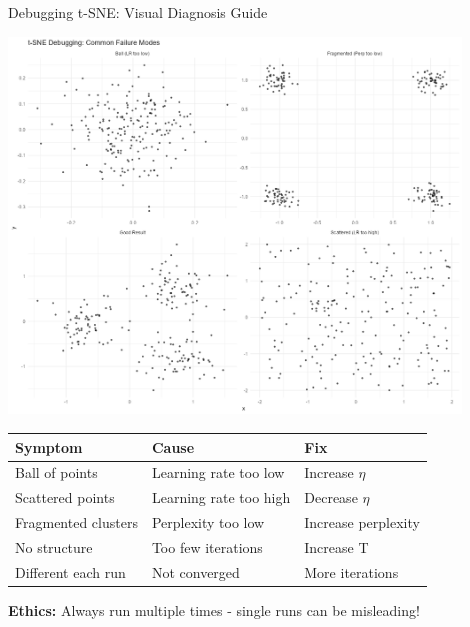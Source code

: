 \documentclass[aspectratio=169]{beamer}
\newcommand{\ethics}[1]{\colorbox{purple!10}{\textcolor{ethicscolor}{\textbf{Ethics:} #1}}}
\begin{document}
\begin{frame}{Debugging t-SNE: Visual Diagnosis Guide}
\begin{center}
\includegraphics[width=0.9\textwidth]{./Figures/debugging_visual_guide.png}
\end{center}

\begin{tabular}{l|l|l}
\textbf{Symptom} & \textbf{Cause} & \textbf{Fix}\\
\hline
Ball of points & Learning rate too low & Increase $\eta$\\
Scattered points & Learning rate too high & Decrease $\eta$\\
Fragmented clusters & Perplexity too low & Increase perplexity\\
No structure & Too few iterations & Increase T\\
Different each run & Not converged & More iterations
\end{tabular}

\ethics{Always run multiple times - single runs can be misleading!}
\end{frame}
\end{document}
